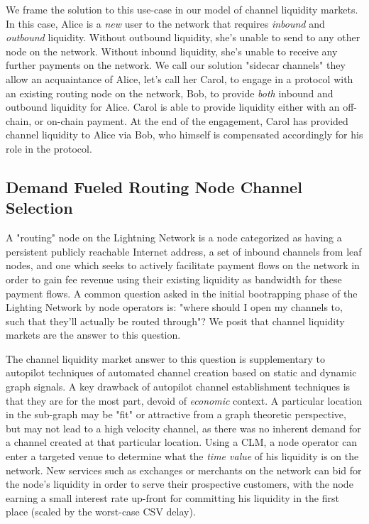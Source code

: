 \documentclass[12pt,a4paper]{article}
\theoremstyle{definition}
\begin{document}
We frame the solution to this use-case in our model of channel liquidity
markets. In this case, Alice is a \emph{new} user to the network that requires
\emph{inbound} and \emph{outbound} liquidity. Without outbound liquidity, she's
unable to send to any other node on the network. Without inbound liquidity,
she's unable to receive any further payments on the network. We call our
solution "sidecar channels" they allow an acquaintance of Alice, let's call her
Carol, to engage in a protocol with an existing routing node on the network,
Bob, to provide \emph{both} inbound and outbound liquidity for Alice. Carol is
able to provide liquidity either with an off-chain, or on-chain payment. At the
end of the engagement, Carol has provided channel liquidity to Alice via Bob,
who himself is compensated accordingly for his role in the protocol.

\subsection{Demand Fueled Routing Node Channel Selection}

A "routing" node on the Lightning Network is a node categorized as having a
persistent publicly reachable Internet address, a set of inbound channels from
leaf nodes, and one which seeks to actively facilitate payment flows on the
network in order to gain fee revenue using their existing liquidity as
bandwidth for these payment flows. A common question asked in the initial
bootrapping phase of the Lighting Network by node operators is: "where should I
open my channels to, such that they'll actually be routed through"? We posit
that channel liquidity markets are the answer to this question.

The channel liquidity market answer to this question is  supplementary to
autopilot \cite{autopilot} techniques of automated channel creation based on
static and dynamic graph signals. A key drawback of autopilot channel
establishment techniques is that they are for the most part, devoid of
\emph{economic} context. A particular location in the sub-graph may be "fit" or
attractive from a graph theoretic perspective, but may not lead to a high
velocity channel, as there was no inherent demand for a channel created at that
particular location. Using a CLM, a node operator can enter a targeted venue to
determine what the \emph{time value} of his liquidity is on the network. New
services such as exchanges or merchants on the network can bid for the node's
liquidity in order to serve their prospective customers, with the node earning
a small interest rate up-front for committing his liquidity in the first place
(scaled by the worst-case CSV delay).
\end{document}
